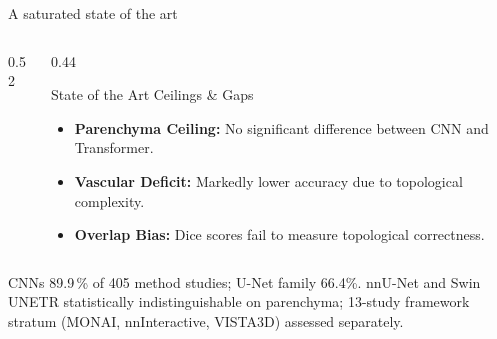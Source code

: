 \documentclass[aspectratio=169,11pt,xcolor=table]{beamer}
\begin{document}
\begin{frame}{A saturated state of the art}
\footnotesize
\begin{columns}[c]
\begin{column}{0.52\linewidth}
  \centering
\end{column}
\begin{column}{0.44\linewidth}
  \begin{block}{State of the Art Ceilings \& Gaps}
    \begin{itemize}
    \setlength\itemsep{4pt}
    \item \textbf{Parenchyma Ceiling:} No significant difference between CNN and Transformer.
    \item \textbf{Vascular Deficit:} Markedly lower accuracy due to topological complexity.
    \item \textbf{Overlap Bias:} Dice scores fail to measure topological correctness.
    \end{itemize}
  \end{block}
\end{column}
\end{columns}
\vspace{0.1cm}
\scriptsize\color{gray}CNNs 89.9\,\% of 405 method studies; U-Net family 66.4\%. nnU-Net and Swin UNETR statistically indistinguishable on parenchyma; 13-study framework stratum (MONAI, nnInteractive, VISTA3D) assessed separately.
\end{frame}
\end{document}
